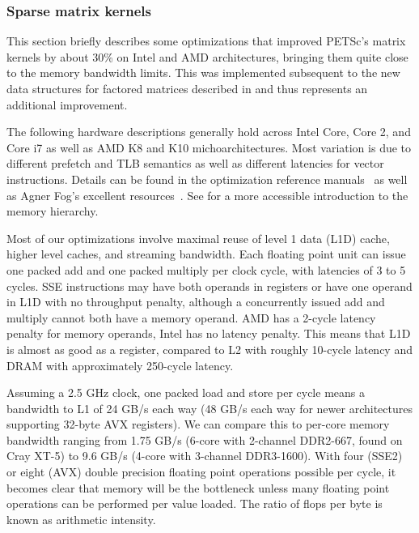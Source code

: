 \subsubsection{Sparse matrix kernels}

This section briefly describes some optimizations that improved PETSc's matrix kernels by about 30\% on Intel and AMD architectures, bringing them quite close to the memory bandwidth limits.
This was implemented subsequent to the new data structures for factored matrices described in \cite{smith2010sparse} and thus represents an additional improvement.

The following hardware descriptions generally hold across Intel Core, Core 2, and Core i7 as well as AMD K8 and K10 michoarchitectures.
Most variation is due to different prefetch and TLB semantics as well as different latencies for vector instructions.
Details can be found in the optimization reference manuals~\cite{intel2011optimization,amd2009optimization} as well as Agner Fog's excellent resources~\cite{fog2011michoarchitecture,fog2011instruction}.
See \cite{drepper2007memory} for a more accessible introduction to the memory hierarchy.

Most of our optimizations involve maximal reuse of level 1 data (L1D) cache, higher level caches, and streaming bandwidth.
Each floating point unit can issue one packed add and one packed multiply per clock cycle, with latencies of 3 to 5 cycles.
SSE instructions may have both operands in registers or have one operand in L1D with no throughput penalty, although a concurrently issued add and multiply cannot both have a memory operand.
AMD has a 2-cycle latency penalty for memory operands, Intel has no latency penalty.
This means that L1D is almost as good as a register, compared to L2 with roughly 10-cycle latency and DRAM with approximately 250-cycle latency.

Assuming a 2.5 GHz clock, one packed load and store per cycle means a bandwidth to L1 of 24 GB/s each way (48 GB/s each way for newer architectures supporting 32-byte AVX registers).
We can compare this to per-core memory bandwidth ranging from 1.75 GB/s (6-core with 2-channel DDR2-667, found on Cray XT-5) to 9.6 GB/s (4-core with 3-channel DDR3-1600).
With four (SSE2) or eight (AVX) double precision floating point operations possible per cycle, it becomes clear that memory will be the bottleneck unless many floating point operations can be performed per value loaded.
The ratio of flops per byte is known as arithmetic intensity.

